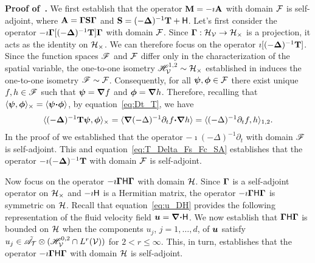 \documentclass[amsa]{ipart}
\begin{document}
\textbf{Proof of~.}\hspace{1ex}
%
We first establish that the operator $\mathbf{M}=-\imath \mathbf{A}$ with domain
$\mathcal{F}$ is self-adjoint, where $\mathbf{A}=\mbox{\boldmath${\Gamma}$}\mathbf{S}\mbox{\boldmath${\Gamma}$}$ and
$\mathbf{S}=(-\mbox{\boldmath${\Delta}$})^{-1}\mathbf{T}+\mathsf{H}$. Let's first 
consider the operator $-\imath\mbox{\boldmath${\Gamma}$}[(-\mbox{\boldmath${\Delta}$})^{-1}\mathbf{T}]\mbox{\boldmath${\Gamma}$}$
with domain $\mathcal{F}$. Since $\mbox{\boldmath${\Gamma}$}:\mathcal{H}_{\mathcal{V}}\to\mathcal{H}_\times$ is
a projection, it acts as the identity on $\mathcal{H}_\times$. We can therefore
focus on the operator $\imath[(-\mbox{\boldmath${\Delta}$})^{-1}\mathbf{T}]$. Since the function
spaces $\mathscr{F}$ and $\mathcal{F}$ differ only in the characterization of the
spatial variable, the one-to-one isometry $\mathscr{H}^{1,2}_{\mathcal{V}}\sim\mathcal{H}_\times$
established in  induces the one-to-one
isometry $\mathscr{F}\sim\mathcal{F}$. Consequently, for all $\mbox{\boldmath${\psi}$},\mbox{\boldmath${\phi}$}\in\mathcal{F}$ there
exist unique $f,h\in\mathscr{F}$ such that $\mbox{\boldmath${\psi}$}=\mbox{\boldmath${\nabla}$} f$ and $\mbox{\boldmath${\phi}$}=\mbox{\boldmath${\nabla}$} 
h$. Therefore, recalling that $\langle\mbox{\boldmath${\psi}$},\mbox{\boldmath${\phi}$}\rangle_\times=\langle\mbox{\boldmath${\psi}$}\mbox{\boldmath${\cdot}$}\mbox{\boldmath${\phi}$}\rangle$, by
equation~\eqref{eq:Dt_T}, we have
%
\begin{align}\label{eq:T_Delta_Fs_Fc_SA}
  \langle(-\bDelta)^{-1}\Tb\bpsi,\bphi\rangle_\times
  =\langle\bnabla(-\Delta)^{-1}\partial_tf\bcdot\bnabla h\rangle
  =\langle(-\Delta)^{-1}\partial_tf,h\rangle_{1,2}.
\end{align}
%
In the proof of  we established that the
operator $-\imath(-\Delta)^{-1}\partial_t$ with domain $\mathscr{F}$ is self-adjoint. This and
equation~\eqref{eq:T_Delta_Fs_Fc_SA} establishes that the operator
$-\imath(-\mbox{\boldmath${\Delta}$})^{-1}\mathbf{T}$ with domain $\mathcal{F}$ is self-adjoint.       



Now focus on the operator $-\imath\mbox{\boldmath${\Gamma}$}\mathsf{H}\mbox{\boldmath${\Gamma}$}$ with domain
$\mathcal{H}$. Since $\mbox{\boldmath${\Gamma}$}$ is a self-adjoint operator on $\mathcal{H}_\times$ and
$-\imath\mathsf{H}$ is a Hermitian matrix, the operator $-\imath\mbox{\boldmath${\Gamma}$}\mathsf{H}\mbox{\boldmath${\Gamma}$}$ is
symmetric on $\mathcal{H}$. Recall that equation~\eqref{eq:u_DH} provides the
following representation of the fluid velocity field
$\boldsymbol{u}=\mbox{\boldmath${\nabla}$}\mbox{\boldmath${\cdot}$}\mathsf{H}$. We now establish that $\mbox{\boldmath${\Gamma}$}\mathsf{H}\mbox{\boldmath${\Gamma}$}$ is 
bounded on $\mathcal{H}$ when the components $u_j$, $j=1,\ldots,d$, of $\boldsymbol{u}$
satisfy $u_j\in\tilde{\mathscr{A}}_{\mathcal{T}}\otimes (\mathscr{H}^{0,2}_{\mathcal{V}}\cap L^r(\mathcal{V}))$ for 
$2<r\leq\infty$. This, in turn, establishes that the operator
$-\imath\mbox{\boldmath${\Gamma}$}\mathsf{H}\mbox{\boldmath${\Gamma}$}$ with domain $\mathcal{H}$ is
self-adjoint.
\end{document}
